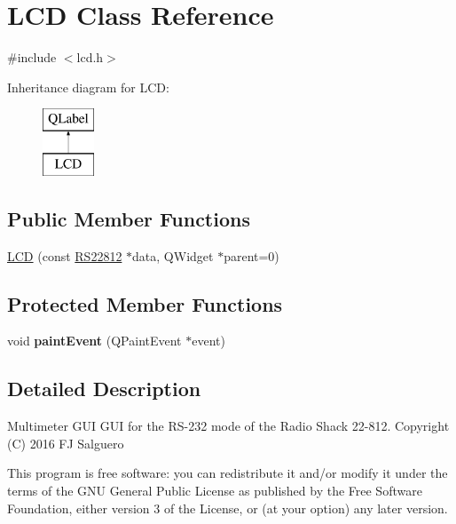 \hypertarget{classLCD}{\section{L\-C\-D Class Reference}
\label{classLCD}
}


{\ttfamily \#include $<$lcd.\-h$>$}

Inheritance diagram for L\-C\-D\-:\begin{figure}[H]
\begin{center}
\leavevmode
\includegraphics[height=2.000000cm]{classLCD}
\end{center}
\end{figure}
\subsection*{Public Member Functions}
\begin{DoxyCompactItemize}
\item 
\hyperlink{classLCD_a525b305d4aaf0d45cfd04b9b16096482}{L\-C\-D} (const \hyperlink{classRS22812}{R\-S22812} $\ast$data, Q\-Widget $\ast$parent=0)
\end{DoxyCompactItemize}
\subsection*{Protected Member Functions}
\begin{DoxyCompactItemize}
\item 
\hypertarget{classLCD_a259fac152add9afdeb4543af4998d14b}{void {\bfseries paint\-Event} (Q\-Paint\-Event $\ast$event)}\label{classLCD_a259fac152add9afdeb4543af4998d14b}

\end{DoxyCompactItemize}


\subsection{Detailed Description}
Multimeter G\-U\-I G\-U\-I for the R\-S-\/232 mode of the Radio Shack 22-\/812. Copyright (C) 2016 F\-J Salguero

This program is free software\-: you can redistribute it and/or modify it under the terms of the G\-N\-U General Public License as published by the Free Software Foundation, either version 3 of the License, or (at your option) any later version.

